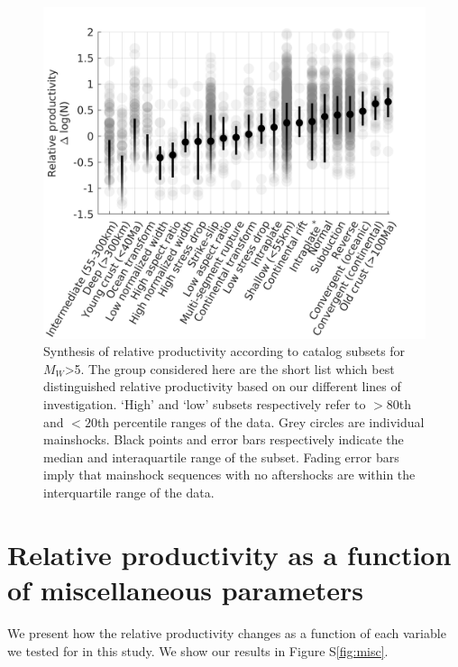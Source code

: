 \documentclass[draft]{agujournal}
\begin{document}
\begin{figure}
\centering
\label{fig:caltech}
\includegraphics{figures/cal_tech_mw5.png}
\caption{Synthesis of relative productivity according to catalog subsets for $M_W$>5. The group considered here are the short list which best distinguished relative productivity based on our different lines of investigation. `High' and `low' subsets respectively refer to $>80$th and $<20$th percentile ranges of the data. Grey circles are individual mainshocks. Black points and error bars respectively indicate the median and interaquartile range of the subset. Fading error bars imply that mainshock sequences with no aftershocks are within the interquartile range of the data.}
\end{figure}   

    
\section*{Relative productivity as a function of miscellaneous parameters}

We present how the relative productivity changes as a function of each variable we tested for in this study. We show our results in Figure S\ref{fig:misc}.
\end{document}
